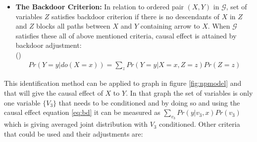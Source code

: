 \documentclass[main=english,12pt,a4paper,pdftex,econ,utf8]{aaltothesis}
\newcommand{\g}{\mathcal{G}}
\begin{document}
\begin{itemize}
    \item[] \textbf{The Backdoor Criterion:} In relation to ordered pair $(X,Y)$ in $\g$, set of variables $Z$ satisfies backdoor criterion if there is no descendants of $X$ in $Z$ and $Z$ blocks all paths between $X$ and $Y$ containing arrow to $X$. When $\g$ satisfies these all of above mentioned criteria, causal effect is attained by backdoor adjustment: \\ 
    (\cite{Pearl2016})
    \begin{align}\label{eq:bd}
        Pr(Y=y|do(X=x))=\sum_{z}Pr(Y=y|X=x,Z=z)Pr(Z=z)
    \end{align}
\end{itemize}

\noindent This identification method can be applied to graph in figure \ref{fig:npmodel} and that will give the causal effect of $X$ to $Y$. In that graph the set of variables is only one variable $\{V_{3}\}$ that needs to be conditioned and by doing so and using the causal effect equation \ref{eq:bd} it can be measured as $\sum_{v_3}Pr(y|v_3,x)Pr(v_3)$ which is giving averaged joint distribution with $V_{3}$ conditioned. Other criteria that could be used and their adjustments are:
\end{document}
